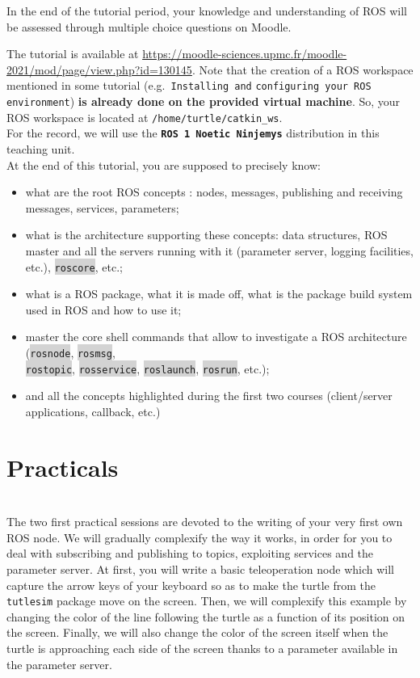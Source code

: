 \documentclass[10pt,a4paper,printanswers]{upmc}
\newcommand{\myline}{\noindent\makebox[\linewidth]{\rule{\textwidth}{0.7pt}}}
\newcommand{\mytext}[1]{\colorbox{lightgray}{\texttt{#1}}}
\begin{document}
In the end of the tutorial period, your knowledge and understanding of ROS will be assessed through
multiple choice questions on Moodle.
\begin{mdframed}[style=graybox]
  The tutorial is available at
  \url{https://moodle-sciences.upmc.fr/moodle-2021/mod/page/view.php?id=130145}. Note that the
  creation of a ROS workspace mentioned in some tutorial (e.g.\ \texttt{Installing and}
  \texttt{configuring your ROS environment}) \textbf{is already done on the provided virtual
    machine}. So, your ROS workspace is located at \texttt{/home/turtle/catkin\_ws}.\\

  \noindent For the record, we will use the \textbf{\texttt{ROS 1 Noetic Ninjemys}} distribution in this
  teaching
  unit.\\

  \noindent At the end of this tutorial, you are supposed to precisely know:
  \begin{itemize}
    \itemsep=-1pt
    \item what are the root ROS concepts : nodes, messages, publishing and receiving messages,
          services, parameters;
    \item what is the architecture supporting these concepts: data structures, ROS master and all
          the servers running with it (parameter server, logging facilities, etc.),
          \mytext{roscore}, etc.;
    \item what is a ROS package, what it is made off,  what is the package build system used in ROS
          and how to use it;
    \item master the core shell commands that allow to investigate a ROS architecture
          (\mytext{rosnode}, \mytext{rosmsg}, \\\mytext{rostopic}, \mytext{rosservice},
          \mytext{roslaunch}, \mytext{rosrun}, etc.);
    \item and all the concepts highlighted during the first two courses (client/server applications,
          callback, etc.)
  \end{itemize}
\end{mdframed}
\newpage
\section{Practicals}
\vspace{-0.5cm}\myline\\

The two first practical sessions are devoted to the writing of your very first own ROS node. We will
gradually complexify the way it works, in order for you to deal with subscribing and publishing to
topics, exploiting services and the parameter server. At first, you will write a basic teleoperation
node which will capture the arrow keys of your keyboard so as to make the turtle from the
\texttt{tutlesim} package move on the screen. Then, we will complexify this example by changing the
color of the line following the turtle as a function of its position on the screen. Finally, we will
also change the color of the screen itself when the turtle is approaching each side of the screen
thanks to a parameter available in the parameter server.
\end{document}
